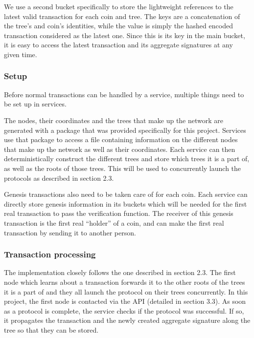 \documentclass[11pt, a4paper, twoside, openright]{article}
\begin{document}
We use a second bucket specifically to store the lightweight references to the latest valid transaction for each coin and tree. The keys are a concatenation of the tree's and coin's identities, while the value is simply the hashed encoded transaction considered as the latest one. Since this is its key in the main bucket, it is easy to access the latest transaction and its aggregate signatures at any given time.

\subsubsection{Setup}

Before normal transactions can be handled by a service, multiple things need to be set up in services.

The nodes, their coordinates and the trees that make up the network are generated with a package that was provided specifically for this project. Services use that package to access a file containing information on the different nodes that make up the network as well as their coordinates. Each service can then deterministically construct the different trees and store which trees it is a part of, as well as the roots of those trees. This will be used to concurrently launch the protocols as described in section 2.3.

Genesis transactions also need to be taken care of for each coin. Each service can directly store genesis information in its buckets which will be needed for the first real transaction to pass the verification function. The receiver of this genesis transaction is the first real ``holder'' of a coin, and can make the first real transaction by sending it to another person.

\subsubsection{Transaction processing}

The implementation closely follows the one described in section 2.3. The first node which learns about a transaction forwards it to the other roots of the trees it is a part of and they all launch the protocol on their trees concurrently. In this project, the first node is contacted via the API (detailed in section 3.3). As soon as a protocol is complete, the service checks if the protocol was successful. If so, it propagates the transaction and the newly created aggregate signature along the tree so that they can be stored. 
\end{document}
